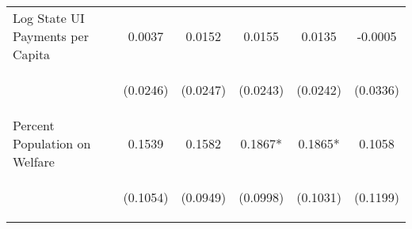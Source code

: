 \begin{center}
\begin{tabular}{lccccc}
\noalign{\smallskip}Log State UI Payments per Capita & \begin{scriptsize}0.0037\end{scriptsize} & \begin{scriptsize}0.0152\end{scriptsize} & \begin{scriptsize}0.0155\end{scriptsize} & \begin{scriptsize}0.0135\end{scriptsize} & \begin{scriptsize}-0.0005\end{scriptsize}\\
 & \begin{scriptsize}(0.0246)\end{scriptsize} & \begin{scriptsize}(0.0247)\end{scriptsize} & \begin{scriptsize}(0.0243)\end{scriptsize} & \begin{scriptsize}(0.0242)\end{scriptsize} & \begin{scriptsize}(0.0336)\end{scriptsize}\\
\noalign{\smallskip}Percent Population on Welfare & \begin{scriptsize}0.1539\end{scriptsize} & \begin{scriptsize}0.1582\end{scriptsize} & \begin{scriptsize}0.1867*\end{scriptsize} & \begin{scriptsize}0.1865*\end{scriptsize} & \begin{scriptsize}0.1058\end{scriptsize}\\
 & \begin{scriptsize}(0.1054)\end{scriptsize} & \begin{scriptsize}(0.0949)\end{scriptsize} & \begin{scriptsize}(0.0998)\end{scriptsize} & \begin{scriptsize}(0.1031)\end{scriptsize} & \begin{scriptsize}(0.1199)\end{scriptsize}\\

\end{tabular}
\end{center}
